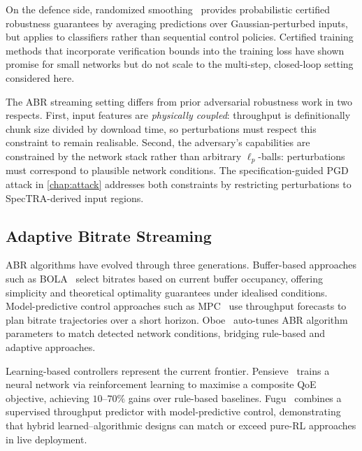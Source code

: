 \documentclass[thesis]{uofithesis} %
\begin{document}
    On the defence side, randomized smoothing~\cite{randomized-smoothing}
    provides probabilistic certified robustness guarantees by
    averaging predictions over Gaussian-perturbed inputs, but applies
    to classifiers rather than sequential control policies.
    Certified training methods that incorporate verification bounds
    into the training loss have shown promise for small networks but
    do not scale to the multi-step, closed-loop setting considered
    here.

    The ABR streaming setting differs from prior adversarial robustness
    work in two respects.  First, input features are \emph{physically
    coupled}: throughput is definitionally chunk size divided by
    download time, so perturbations must respect this constraint to
    remain realisable.  Second, the adversary's capabilities are
    constrained by the network stack rather than arbitrary
    $\ell_p$-balls: perturbations must correspond to plausible network
    conditions.  The specification-guided PGD attack in
    \ref{chap:attack} addresses both constraints by restricting
    perturbations to SpecTRA-derived input regions.


    \subsection{Adaptive Bitrate Streaming}
    \label{sec:related-abr}

    ABR algorithms have evolved through three generations.
    Buffer-based approaches such as BOLA~\cite{bola} select bitrates
    based on current buffer occupancy, offering simplicity and
    theoretical optimality guarantees under idealised conditions.
    Model-predictive control approaches such as
    MPC~\cite{mpc} use throughput forecasts to plan bitrate
    trajectories over a short horizon.  Oboe~\cite{oboe} auto-tunes
    ABR algorithm parameters to match detected network conditions,
    bridging rule-based and adaptive approaches.

    Learning-based controllers represent the current frontier.
    Pensieve~\cite{pensieve} trains a neural network via reinforcement
    learning to maximise a composite QoE objective, achieving
    $10$--$70\%$ gains over rule-based baselines.
    Fugu~\cite{fugu} combines a supervised throughput predictor with
    model-predictive control, demonstrating that hybrid
    learned--algorithmic designs can match or exceed pure-RL
    approaches in live deployment.
\end{document}
